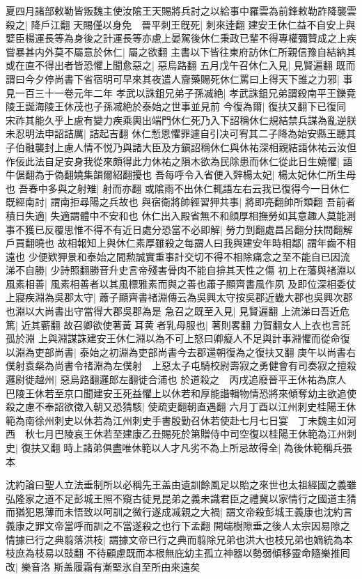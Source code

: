 夏四月諸部敕勒皆叛魏主使汝隂王天賜將兵討之以給事中羅雲為前鋒敕勒詐降襲雲殺之|{
	降戶江翻}
天賜僅以身免　晉平刺王旣死|{
	刺來逹翻}
建安王休仁益不自安上與嬖臣楊運長等為身後之計運長等亦慮上晏駕後休仁秉政已輩不得專權彌贊成之上疾嘗暴甚内外莫不屬意於休仁|{
	屬之欲翻}
主書以下皆往東府訪休仁所親信豫自結納其或在直不得出者皆恐懼上聞愈惡之|{
	惡烏路翻}
五月戊午召休仁入見|{
	見賢遍翻}
既而謂曰今夕停尚書下省宿明可早來其夜遣人齎藥賜死休仁罵曰上得天下誰之力邪|{
	事見一百三十一卷元年二年}
孝武以誅鉏兄弟子孫㓕絶|{
	孝武誅鉏兄弟謂殺南平王鑠竟陵王誕海陵王休茂也子孫㓕絶於泰始之世事並見前}
今復為爾|{
	復扶又翻下已復同}
宋祚其能久乎上慮有變力疾乘輿出端門休仁死乃入下詔稱休仁規結禁兵謀為亂逆朕未忍明法申詔詰厲|{
	詰起吉翻}
休仁慙恩懼罪遽自引决可宥其二子降為始安縣王聽其子伯融襲封上慮人情不悦乃與諸大臣及方鎭詔稱休仁與休祐深相親結語休祐云汝但作佞此法自足安身我從來頗得此力休祐之隕木欲為民除患而休仁從此日生嬈懼|{
	語牛倨翻為于偽翻嬈集韻爾紹翻擾也}
吾每呼令入省便入辤楊太妃|{
	楊太妃休仁所生母也}
吾春中多與之射雉|{
	射而亦翻}
或隂雨不出休仁輒語左右云我已復得今一日休仁既經南討|{
	謂南拒尋陽之兵故也}
與宿衛將帥經習狎共事|{
	將即亮翻帥所類翻}
吾前者積日失適|{
	失適謂體中不安和也}
休仁出入殿省無不和顔厚相撫勞如其意趣人莫能測事不獲已反覆思惟不得不有近日處分恐當不必即解|{
	勞力到翻處昌呂翻分扶問翻解戶買翻曉也}
故相報知上與休仁素厚雖殺之每謂人曰我與建安年時相鄰|{
	謂年齒不相遠也}
少便欵狎景和泰始之間勲誠實重事計交切不得不相除痛念之至不能自已因流涕不自勝|{
	少詩照翻勝音升史言帝殘害骨肉不能自揜其天性之傷}
初上在藩與禇淵以風素相善|{
	風素相善者以其風標雅素而與之善也蕭子顯齊書風作夙}
及即位深相委仗上寢疾淵為吳郡太守|{
	蕭子顯齊書禇淵傳云為吳興太守按吳郡近畿大郡也吳興次郡也淵以大尚書出守當得大郡吳郡為是}
急召之既至入見|{
	見賢遍翻}
上流涕曰吾近危篤|{
	近其蘄翻}
故召卿欲使著黃耳黄者乳母服也|{
	著則畧翻力賀翻女人上衣也言託孤於淵}
上與淵謀誅建安王休仁淵以為不可上怒曰卿癡人不足與計事淵懼而從命復以淵為吏部尚書|{
	泰始之初淵為吏部尚書今去郡還朝復為之復扶又翻}
庚午以尚書右僕射袁粲為尚書令禇淵為左僕射　上惡太子屯騎校尉壽寂之勇健會有司奏寂之擅殺邏尉徙越州|{
	惡烏路翻邏郎左翻徙合浦也}
於道殺之　丙戌追廢晉平王休祐為庶人　巴陵王休若至京口聞建安王死益懼上以休若和厚能諧輯物情恐將來傾奪幼主欲追使殺之慮不奉詔欲徵入朝又恐猜駭|{
	使疏吏翻朝直遇翻}
六月丁酉以江州刺史桂陽王休範為南徐州刺史以休若為江州刺史手書殷勤召休若使赴七月七日宴　丁未魏主如河西　秋七月巴陵哀王休若至建康乙丑賜死於第贈侍中司空復以桂陽王休範為江州刺史|{
	復扶又翻}
時上諸弟俱盡唯休範以人才凡劣不為上所忌故得全|{
	為後休範稱兵張本}


沈約論曰聖人立法垂制所以必稱先王盖由遺訓餘風足以貽之來世也太祖經國之義雖弘隆家之道不足彭城王照不窺古徒見昆弟之義未識君臣之禮冀以家情行之國道主猜而猶犯恩薄而未悟致以呵訓之微行遂成㓕親之大禍|{
	謂文帝殺彭城王義康也沈約言義康之罪文帝當呼而訓之不當遂殺之也行下孟翻}
開端樹隙垂之後人太宗因易隙之情據已行之典翦落洪枝|{
	謂據文帝已行之典而翦除兄弟也洪大也枝兄弟也嫡統為本枝庶為枝易以豉翻}
不待顧慮既而本根無庇幼主孤立神器以勢弱傾移靈命隨樂推囘改|{
	樂音洛}
斯盖履霜有漸堅氷自至所由來遠矣

